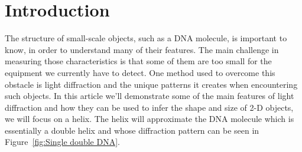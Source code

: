 \section{Introduction}\label{sec:introduction}
The structure of small-scale objects, such as a DNA molecule, is important to know, in order to understand many of their features.
The main challenge in measuring those characteristics is that some of them are too small for the equipment we currently have to detect.
One method used to overcome this obstacle is light diffraction and the unique patterns it creates when encountering such objects.
In this article we'll demonstrate some of the main features of light diffraction and how they can be used to infer the shape and size of 2-D objects, we will focus on a helix.
The helix will approximate the DNA molecule which is essentially a double helix and whose diffraction pattern can be seen in Figure~\ref{fig:Single double DNA}.





